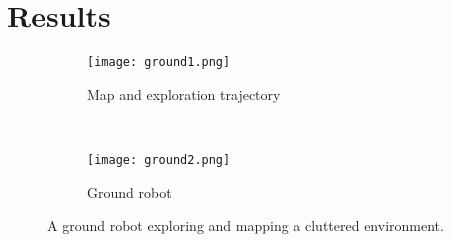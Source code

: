 \section{Results}
\label{sec:results}

\begin{figure*}
  \centering
  \begin{subfigure}{0.47\textwidth}
    \centering
    \texttt{[image: ground1.png]}
    \caption{Map and exploration trajectory\label{fig:ground_bot1}}
  \end{subfigure}
  ~
  \begin{subfigure}{0.47\textwidth}
    \centering
    \texttt{[image: ground2.png]}
    \caption{Ground robot\label{fig:ground_bot2}}
  \end{subfigure}
  \caption{A ground robot exploring and mapping a cluttered environment.\label{fig:ground_bot}}
\end{figure*}

